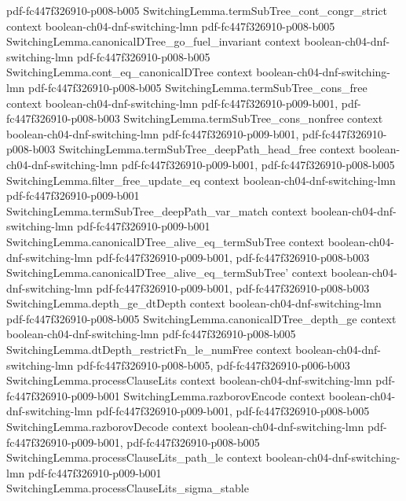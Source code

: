 \begin{theorem}
  {pdf-fc447f326910-p008-b005}
\proofstep
  {SwitchingLemma.termSubTree_cont_congr_strict}
  {context}
  {boolean-ch04-dnf-switching-lmn}
  {pdf-fc447f326910-p008-b005}
\proofstep
  {SwitchingLemma.canonicalDTree_go_fuel_invariant}
  {context}
  {boolean-ch04-dnf-switching-lmn}
  {pdf-fc447f326910-p008-b005}
\proofstep
  {SwitchingLemma.cont_eq_canonicalDTree}
  {context}
  {boolean-ch04-dnf-switching-lmn}
  {pdf-fc447f326910-p008-b005}
\proofstep
  {SwitchingLemma.termSubTree_cons_free}
  {context}
  {boolean-ch04-dnf-switching-lmn}
  {pdf-fc447f326910-p009-b001,
    pdf-fc447f326910-p008-b003}
\proofstep
  {SwitchingLemma.termSubTree_cons_nonfree}
  {context}
  {boolean-ch04-dnf-switching-lmn}
  {pdf-fc447f326910-p009-b001,
    pdf-fc447f326910-p008-b003}
\proofstep
  {SwitchingLemma.termSubTree_deepPath_head_free}
  {context}
  {boolean-ch04-dnf-switching-lmn}
  {pdf-fc447f326910-p009-b001,
    pdf-fc447f326910-p008-b005}
\proofstep
  {SwitchingLemma.filter_free_update_eq}
  {context}
  {boolean-ch04-dnf-switching-lmn}
  {pdf-fc447f326910-p009-b001}
\proofstep
  {SwitchingLemma.termSubTree_deepPath_var_match}
  {context}
  {boolean-ch04-dnf-switching-lmn}
  {pdf-fc447f326910-p009-b001}
\proofstep
  {SwitchingLemma.canonicalDTree_alive_eq_termSubTree}
  {context}
  {boolean-ch04-dnf-switching-lmn}
  {pdf-fc447f326910-p009-b001,
    pdf-fc447f326910-p008-b003}
\proofstep
  {SwitchingLemma.canonicalDTree_alive_eq_termSubTree'}
  {context}
  {boolean-ch04-dnf-switching-lmn}
  {pdf-fc447f326910-p009-b001,
    pdf-fc447f326910-p008-b003}
\proofstep
  {SwitchingLemma.depth_ge_dtDepth}
  {context}
  {boolean-ch04-dnf-switching-lmn}
  {pdf-fc447f326910-p008-b005}
\proofstep
  {SwitchingLemma.canonicalDTree_depth_ge}
  {context}
  {boolean-ch04-dnf-switching-lmn}
  {pdf-fc447f326910-p008-b005}
\proofstep
  {SwitchingLemma.dtDepth_restrictFn_le_numFree}
  {context}
  {boolean-ch04-dnf-switching-lmn}
  {pdf-fc447f326910-p008-b005,
    pdf-fc447f326910-p006-b003}
\proofstep
  {SwitchingLemma.processClauseLits}
  {context}
  {boolean-ch04-dnf-switching-lmn}
  {pdf-fc447f326910-p009-b001}
\proofstep
  {SwitchingLemma.razborovEncode}
  {context}
  {boolean-ch04-dnf-switching-lmn}
  {pdf-fc447f326910-p009-b001,
    pdf-fc447f326910-p008-b005}
\proofstep
  {SwitchingLemma.razborovDecode}
  {context}
  {boolean-ch04-dnf-switching-lmn}
  {pdf-fc447f326910-p009-b001,
    pdf-fc447f326910-p008-b005}
\proofstep
  {SwitchingLemma.processClauseLits_path_le}
  {context}
  {boolean-ch04-dnf-switching-lmn}
  {pdf-fc447f326910-p009-b001}
\proofstep
  {SwitchingLemma.processClauseLits_sigma_stable}

\end{theorem}
